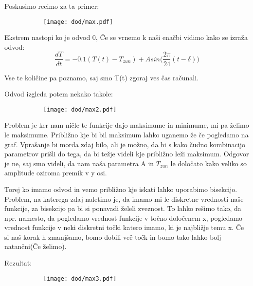 \documentclass{article}
\begin{document}
Poskusimo recimo za ta primer:

\begin{figure}[H]
\centering
\begin{subfigure}{\textwidth}
\texttt{[image: dod/max.pdf]}
\end{subfigure}
\end{figure}

Ekstrem nastopi ko je odvod 0, Če se vrnemo k naši enačbi vidimo kako se izraža odvod:
\begin{equation*}
\frac{dT}{dt} = -0.1(T(t) - T_{zun}) + Asin\Big(\frac{2\pi}{24}(t-\delta)\Big)
\end{equation*}

Vse te količine pa poznamo, saj smo T(t) zgoraj ves čas računali.

Odvod izgleda potem nekako takole:

\begin{figure}[H]
\centering
\begin{subfigure}{\textwidth}
\texttt{[image: dod/max2.pdf]}
\end{subfigure}
\end{figure}

Problem je ker nam ničle te funkcije dajo maksimume in minimume, mi pa želimo le maksimume. Približno kje bi bil maksimum lahko uganemo že če pogledamo na graf. Vprašanje bi morda zdaj bilo, ali je možno, da bi s kako čudno kombinacijo parametrov prišli do tega, da bi težje videli kje približno leži maksimum. Odgovor je ne, saj smo videli, da nam naša parametra A in $T_{zun}$ le določato kako veliko so amplitude oziroma premik v y osi.

Torej ko imamo odvod in vemo približno kje iskati lahko uporabimo bisekcijo. Problem, na katerega zdaj naletimo je, da imamo mi le diskretne vrednosti naše funkcije, za bisekcijo pa bi si ponavadi želeli zveznost. To lahko rešimo tako, da npr. namesto, da pogledamo vrednost funkcije v točno določenem x, pogledamo vrednost funkcije v neki diskretni točki katero imamo, ki je najbližje temu x. Če si naš korak h zmanjšamo, bomo dobili več točk in bomo tako lahko bolj natančni(Če želimo).

Rezultat:

\begin{figure}[H]
\centering
\begin{subfigure}{\textwidth}
\texttt{[image: dod/max3.pdf]}
\end{subfigure}
\end{figure} 
\end{document}
